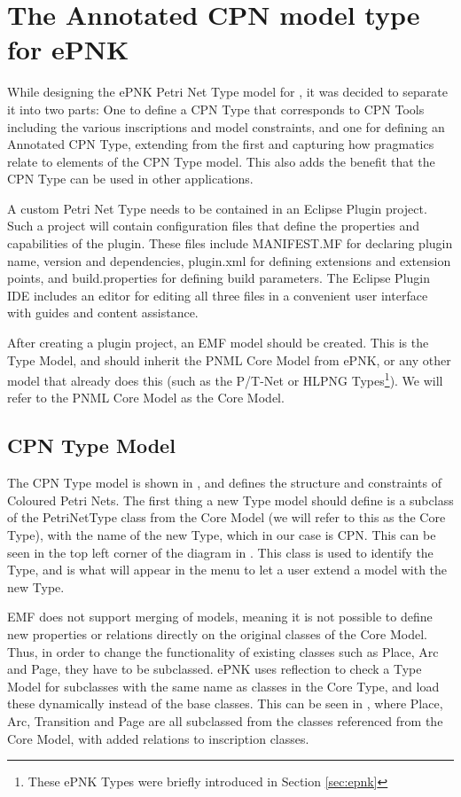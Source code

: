 \section{The Annotated CPN model type for ePNK}
While designing the ePNK Petri Net Type model for \thename{}, it was decided to
separate it into two parts: One to define a CPN Type that corresponds to CPN
Tools including the various inscriptions and model constraints, and one
for defining an Annotated CPN Type, extending from the first and capturing how
pragmatics relate to elements of the CPN Type model.
This also adds the benefit that the CPN Type can be used in other
applications.

A custom Petri Net Type needs to be contained in an Eclipse Plugin project.
Such a project will contain configuration files that define the properties and
capabilities of the plugin. These files include MANIFEST.MF for declaring plugin
name, version and dependencies, plugin.xml for defining extensions and extension
points, and build.properties for defining build parameters. The Eclipse Plugin
IDE includes an editor for editing all three files in a convenient user
interface with guides and content assistance.

After creating a plugin project, an EMF model should be created. This is the
Type Model, and should inherit the PNML Core Model from ePNK, or any other model
that already does this (such as the P/T-Net or HLPNG Types\footnote{These
ePNK Types were briefly introduced in Section \ref{sec:epnk}}).
We will refer to the PNML Core Model as the Core Model.

\subsection{CPN Type Model}
The CPN Type model is shown in , and defines the
structure and constraints of Coloured Petri Nets. The first thing a new Type
model should define is a subclass of the PetriNetType class from the Core Model
(we will refer to this as the Core Type), with the name of the new Type, which in
our case is CPN. This can be seen in the top left corner of the diagram in
. This class is used to identify the Type, and is
what will appear in the menu to let a user extend a model with the new Type.


EMF does not support merging of models, meaning it is not possible to define new
properties or relations directly on the original classes of the Core Model.
Thus, in order to change the functionality of existing classes such as Place,
Arc and Page, they have to be subclassed. ePNK uses reflection to check a
Type Model for subclasses with the same name as classes in the Core Type, and
load these dynamically instead of the base classes.
This can be seen in , where Place, Arc, Transition and
Page are all subclassed from the classes referenced from the Core Model, with
added relations to inscription classes.

